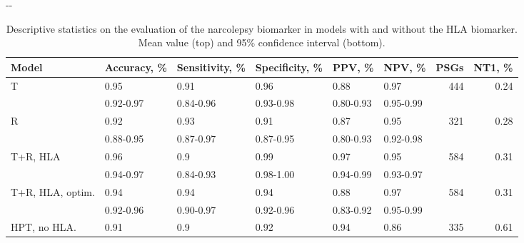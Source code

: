 \begin{table}
    \small
    \begin{adjustwidth*}{}{-\marginparwidth-\marginparsep}
    \begin{threeparttable}
    \caption[Narcolepsy biomarker performance]{Descriptive statistics on the evaluation of the narcolepsy biomarker in models with and without the \ac{HLA} biomarker. Mean value (top) and 95\% confidence interval (bottom).}
    \label{tab:paperiii-supptable06}
    \begin{tabular}{@{}llllllrr@{}}
        \toprule
        \textbf{Model}      & \textbf{Accuracy}, \% & \textbf{Sensitivity}, \% & \textbf{Specificity}, \% & \textbf{PPV}, \%  & \textbf{NPV}, \%  & \textbf{\acp{PSG}} & \textbf{\ac{NT1}}, \% \\ \midrule
        T                   & 0.95          & 0.91             & 0.96             & 0.88      & 0.97      & 444       & 0.24                       \\
                            & 0.92-0.97     & 0.84-0.96        & 0.93-0.98        & 0.80-0.93 & 0.95-0.99 &           &                            \\
        R                   & 0.92          & 0.93             & 0.91             & 0.87      & 0.95      & 321       & 0.28                       \\
                            & 0.88-0.95     & 0.87-0.97        & 0.87-0.95        & 0.80-0.93 & 0.92-0.98 &           &                            \\
        \multirow[t]{2}{0.175\textwidth}{T+R, HLA} & 0.96          & 0.9              & 0.99             & 0.97      & 0.95      & 584       & 0.31                       \\
                            & 0.94-0.97     & 0.84-0.93        & 0.98-1.00        & 0.94-0.99 & 0.93-0.97 &           &                            \\
        \multirow[t]{2}{0.175\textwidth}{T+R, HLA, optim.}    & 0.94          & 0.94             & 0.94             & 0.88      & 0.97      & 584       & 0.31                       \\
                            & 0.92-0.96     & 0.90-0.97        & 0.92-0.96        & 0.83-0.92 & 0.95-0.99 &           &                            \\
        \multirow[t]{2}{0.175\textwidth}{HPT, no HLA.}        & 0.91          & 0.9              & 0.92             & 0.94      & 0.86      & 335       & 0.61                       \\

\end{tabular}
\end{threeparttable}
\end{adjustwidth*}
\end{table}
